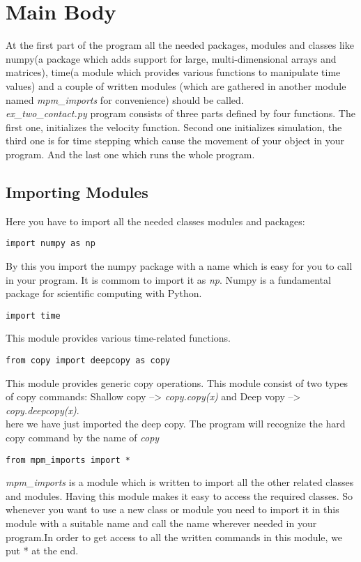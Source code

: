 


\chapter{Main Body} 
\label{sec:Main Body} 
At the first part of the program all the needed packages, modules and classes like numpy(a package which adds support for large, multi-dimensional arrays and matrices), time(a module which provides various functions to manipulate time values) and a couple of written modules (which are gathered in another module named  \emph{mpm\_imports} for convenience) should be called. \\ \emph{ex\_two\_contact.py} program consists of three parts defined by four functions. The first one, initializes the velocity function. Second one initializes simulation, the third one is for time stepping which cause the movement of your object in your program. And the last one which runs the whole program.

\section{Importing Modules}
Here you have to import all the needed classes modules and packages:

\begin{lstlisting}
import numpy as np
\end{lstlisting}

By this you import the numpy package with a name which is easy for you to call in your program. It is commom to import it as \emph{np}. Numpy is a fundamental package for scientific computing with Python.

\begin{lstlisting}
import time
\end{lstlisting}

This module provides various time-related functions.

\begin{lstlisting}
from copy import deepcopy as copy
\end{lstlisting}

This module provides generic copy operations. This module consist of two types of copy commands: Shallow copy --> \emph{copy.copy(x)} and Deep vopy --> \emph{copy.deepcopy(x)}. \\
here we have just imported the deep copy. The program will recognize the hard copy command by the name of \emph{copy}

\begin{lstlisting}
from mpm_imports import *
\end{lstlisting}
\emph{mpm\_imports} is a module which is written to import all the other related classes and modules. Having this module makes it easy to access the required classes. So whenever you want to use a new class or module you need to import it in this module with a suitable name and call the name wherever needed in your program.In order to get access to all the written commands in this module, we put * at the end. 

